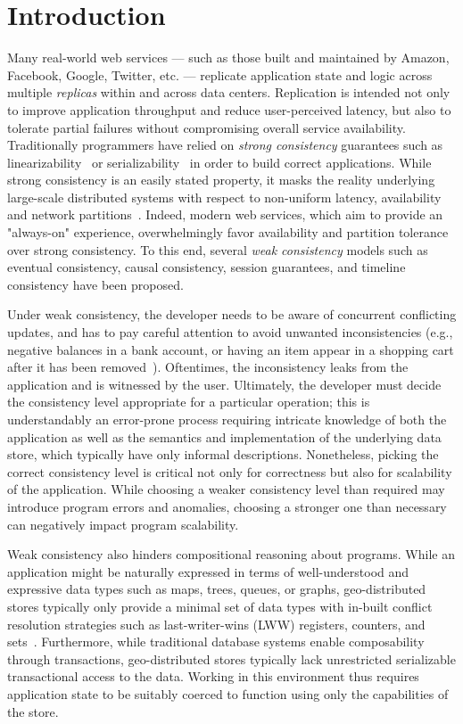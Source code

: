 \section{Introduction}

Many real-world web services --- such as those built and maintained by Amazon,
Facebook, Google, Twitter, etc. --- replicate application state and logic
across multiple \emph{replicas} within and across data centers. Replication is
intended not only to improve application throughput and reduce user-perceived
latency, but also to tolerate partial failures without compromising overall
service availability. Traditionally programmers have relied on \emph{strong
consistency} guarantees such as linearizability~\cite{Herlihy1990} or
serializability~\cite{Serializability} in order to build correct applications.
While strong consistency is an easily stated property, it masks the reality
underlying large-scale distributed systems with respect to non-uniform latency,
availability and network partitions~\cite{Brewer2000,Gilbert2002}. Indeed,
modern web services, which aim to provide an "always-on" experience,
overwhelmingly favor availability and partition tolerance over strong
consistency. To this end, several \emph{weak consistency} models such as
eventual consistency, causal consistency, session guarantees, and timeline
consistency have been proposed.

Under weak consistency, the developer needs to be aware of concurrent
conflicting updates, and has to pay careful attention to avoid unwanted
inconsistencies (e.g., negative balances in a bank account, or having an item
appear in a shopping cart after it has been removed~\cite{Dynamo}). Oftentimes,
the inconsistency leaks from the application and is witnessed by the user.
Ultimately, the developer must decide the consistency level appropriate for a
particular operation; this is understandably an error-prone process requiring
intricate knowledge of both the application as well as the semantics and
implementation of the underlying data store, which typically have only informal
descriptions. Nonetheless, picking the correct consistency level is critical
not only for correctness but also for scalability of the application. While
choosing a weaker consistency level than required may introduce program errors
and anomalies, choosing a stronger one than necessary can negatively impact
program scalability.

Weak consistency also hinders compositional reasoning about programs.  While an
application might be naturally expressed in terms of well-understood and
expressive data types such as maps, trees, queues, or graphs, geo-distributed
stores typically only provide a minimal set of data types with in-built
conflict resolution strategies such as last-writer-wins (LWW) registers,
counters, and sets~\cite{Cassandra,DynamoDB}.  Furthermore, while traditional
database systems enable composability through transactions, geo-distributed
stores typically lack unrestricted serializable transactional access to the
data. Working in this environment thus requires application state to be
suitably coerced to function using only the capabilities of the store.

